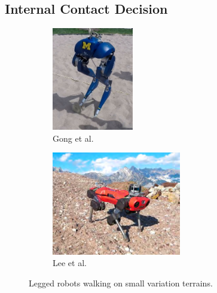 \subsection{Internal Contact Decision}
\begin{figure}[h]
    \centering
    \captionsetup[subfigure]{justification=centering}
    \begin{subfigure}[t]{0.30\linewidth}
    \includegraphics[width=\textwidth,height=4.5cm]{Figures/Chapter_SOTA//cassie_walking_sand.png}
    \caption{Gong et al. \cite{Cassie_feedback_control_2018}\label{fig:walking_task_0}}
    \end{subfigure}
    \begin{subfigure}[t]{0.45\linewidth}
    \includegraphics[width=\textwidth,height=4.5cm]{Figures/Chapter_SOTA//anymal.png}
    \caption{Lee et al. \cite{hutter_challenging_terrain}\label{fig:walking_task_1}}
    \end{subfigure}
    \caption{Legged robots walking on small variation terrains.\label{fig:walking_task}}
\end{figure}


